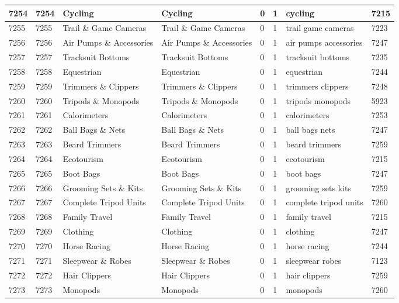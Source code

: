 \begin{longtable}{|l|l|l|l|l|l|l|l|}
7254 & 7254 & Cycling & Cycling & 0 & 1 & cycling & 7215 \\ \hline 
7255 & 7255 & Trail \& Game Cameras & Trail \& Game Cameras & 0 & 1 & trail game cameras & 7223 \\ \hline 
7256 & 7256 & Air Pumps \& Accessories & Air Pumps \& Accessories & 0 & 1 & air pumps accessories & 7247 \\ \hline 
7257 & 7257 & Tracksuit Bottoms & Tracksuit Bottoms & 0 & 1 & tracksuit bottoms & 7235 \\ \hline 
7258 & 7258 & Equestrian & Equestrian & 0 & 1 & equestrian & 7244 \\ \hline 
7259 & 7259 & Trimmers \& Clippers & Trimmers \& Clippers & 0 & 1 & trimmers clippers & 7248 \\ \hline 
7260 & 7260 & Tripods \& Monopods & Tripods \& Monopods & 0 & 1 & tripods monopods & 5923 \\ \hline 
7261 & 7261 & Calorimeters & Calorimeters & 0 & 1 & calorimeters & 7253 \\ \hline 
7262 & 7262 & Ball Bags \& Nets & Ball Bags \& Nets & 0 & 1 & ball bags nets & 7247 \\ \hline 
7263 & 7263 & Beard Trimmers & Beard Trimmers & 0 & 1 & beard trimmers & 7259 \\ \hline 
7264 & 7264 & Ecotourism & Ecotourism & 0 & 1 & ecotourism & 7215 \\ \hline 
7265 & 7265 & Boot Bags & Boot Bags & 0 & 1 & boot bags & 7247 \\ \hline 
7266 & 7266 & Grooming Sets \& Kits & Grooming Sets \& Kits & 0 & 1 & grooming sets kits & 7259 \\ \hline 
7267 & 7267 & Complete Tripod Units & Complete Tripod Units & 0 & 1 & complete tripod units & 7260 \\ \hline 
7268 & 7268 & Family Travel & Family Travel & 0 & 1 & family travel & 7215 \\ \hline 
7269 & 7269 & Clothing & Clothing & 0 & 1 & clothing & 7247 \\ \hline 
7270 & 7270 & Horse Racing & Horse Racing & 0 & 1 & horse racing & 7244 \\ \hline 
7271 & 7271 & Sleepwear \& Robes & Sleepwear \& Robes & 0 & 1 & sleepwear robes & 7123 \\ \hline 
7272 & 7272 & Hair Clippers & Hair Clippers & 0 & 1 & hair clippers & 7259 \\ \hline 
7273 & 7273 & Monopods & Monopods & 0 & 1 & monopods & 7260 \\ \hline 

\end{longtable}
